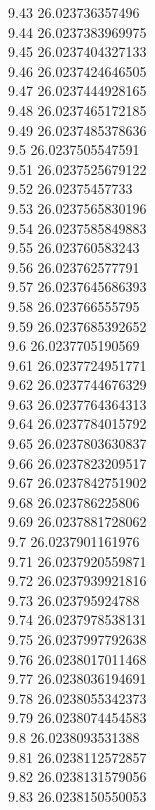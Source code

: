 {9.43	26.023736357496\\
9.44	26.0237383969975\\
9.45	26.0237404327133\\
9.46	26.0237424646505\\
9.47	26.0237444928165\\
9.48	26.0237465172185\\
9.49	26.0237485378636\\
9.5	26.0237505547591\\
9.51	26.0237525679122\\
9.52	26.02375457733\\
9.53	26.0237565830196\\
9.54	26.0237585849883\\
9.55	26.023760583243\\
9.56	26.023762577791\\
9.57	26.0237645686393\\
9.58	26.023766555795\\
9.59	26.0237685392652\\
9.6	26.0237705190569\\
9.61	26.0237724951771\\
9.62	26.0237744676329\\
9.63	26.0237764364313\\
9.64	26.0237784015792\\
9.65	26.0237803630837\\
9.66	26.0237823209517\\
9.67	26.0237842751902\\
9.68	26.023786225806\\
9.69	26.0237881728062\\
9.7	26.0237901161976\\
9.71	26.0237920559871\\
9.72	26.0237939921816\\
9.73	26.023795924788\\
9.74	26.0237978538131\\
9.75	26.0237997792638\\
9.76	26.0238017011468\\
9.77	26.0238036194691\\
9.78	26.0238055342373\\
9.79	26.0238074454583\\
9.8	26.0238093531388\\
9.81	26.0238112572857\\
9.82	26.0238131579056\\
9.83	26.0238150550053\\
}
